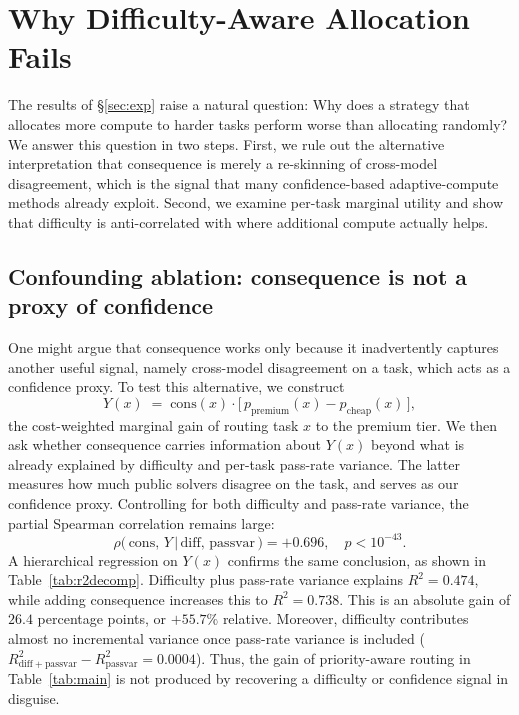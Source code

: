 \documentclass{article}
\begin{document}
\section{Why Difficulty-Aware Allocation Fails}
\label{sec:whyfail}

The results of \S\ref{sec:exp} raise a natural question: Why does a
strategy that allocates more compute to harder tasks perform worse than
allocating randomly? We answer this question in two steps. First, we
rule out the alternative interpretation that consequence is merely a
re-skinning of cross-model disagreement, which is the signal that many
confidence-based adaptive-compute methods already exploit. Second, we
examine per-task marginal utility and show that difficulty is
anti-correlated with where additional compute actually helps.

\subsection{Confounding ablation: consequence is not a proxy of confidence}
\label{sec:p0b}

One might argue that consequence works only because it
inadvertently captures another useful signal, namely cross-model disagreement on a task, which acts as a confidence proxy. To test this alternative, we construct
\[
Y(x) \;=\; \mathrm{cons}(x)\cdot
\bigl[\,p_{\mathrm{premium}}(x) - p_{\mathrm{cheap}}(x)\,\bigr],
\]
the cost-weighted marginal gain of routing task $x$ to the premium
tier. We then ask whether consequence carries information about
$Y(x)$ beyond what is already explained by difficulty and per-task
pass-rate variance. The latter measures how much public solvers
disagree on the task, and serves as our confidence proxy. Controlling
for both difficulty and pass-rate variance, the partial Spearman
correlation remains large:
\[
\rho\bigl(\,\mathrm{cons},\, Y \,\big|\, \mathrm{diff},\,
\mathrm{passvar}\,\bigr) = +0.696,\quad p < 10^{-43}.
\]
A hierarchical regression on $Y(x)$ confirms the same conclusion, as shown in Table~\ref{tab:r2decomp}. Difficulty plus pass-rate variance explains $R^2 = 0.474$, while adding consequence increases this to
$R^2 = 0.738$. This is an absolute gain of $26.4$ percentage points,
or $+55.7\%$ relative. Moreover, difficulty contributes almost no
incremental variance once pass-rate variance is included
($R^2_{\mathrm{diff}+\mathrm{passvar}} -
R^2_{\mathrm{passvar}} = 0.0004$). Thus, the gain of
priority-aware routing in Table~\ref{tab:main} is not produced by
recovering a difficulty or confidence signal in disguise.
\end{document}
